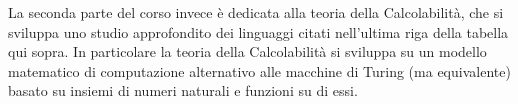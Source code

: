 \documentclass[runningheads,a4paper]{llncs}
\begin{document}
La seconda parte del corso invece \`{e} dedicata alla teoria della Calcolabilit\`{a}, che si sviluppa uno studio approfondito dei linguaggi citati nell'ultima riga della tabella qui sopra. In particolare la teoria della Calcolabilit\`{a} si sviluppa su un modello matematico di computazione alternativo alle macchine di Turing (ma equivalente) basato su insiemi di numeri naturali e funzioni su di essi.

%
\end{document}
